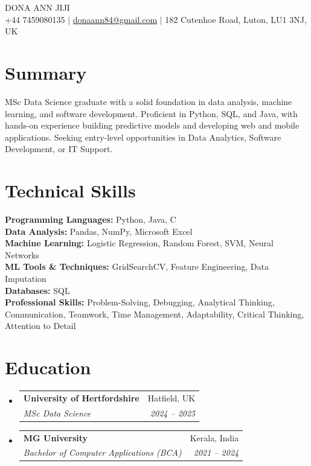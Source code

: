 \documentclass[a4paper,11pt]{article}
\makeatletter
\newcommand{\resumeSubheading}[4]{
  \item
    \begin{tabular*}{0.97\textwidth}[t]{l@{\extracolsep{\fill}}r}
      \textbf{#1} & #2 \\
      \textit{\small#3} & \textit{\small #4} \\
    \end{tabular*}\vspace{-5pt}
}
\newcommand{\resumeSubHeadingListStart}{\begin{itemize}[leftmargin=0.15in, label={}]}
\newcommand{\resumeSubHeadingListEnd}{\end{itemize}}
\makeatother
\begin{document}
\begin{center}
    {\Huge \scshape DONA ANN JIJI} \\ \vspace{4pt}
    \small
    +44 7459080135 $|$
    \href{mailto:donaann84@gmail.com}{donaann84@gmail.com} $|$
    182 Cutenhoe Road, Luton, LU1 3NJ, UK
\end{center}

\section{Summary}
MSc Data Science graduate with a solid foundation in data analysis, machine learning, and software development. Proficient in Python, SQL, and Java, with hands-on experience building predictive models and developing web and mobile applications. Seeking entry-level opportunities in Data Analytics, Software Development, or IT Support.

\section{Technical Skills}
\begin{itemize}[leftmargin=0.15in, label={}]
  \small{\item{
    \textbf{Programming Languages:} Python, Java, C \\
    \textbf{Data Analysis:} Pandas, NumPy, Microsoft Excel \\
    \textbf{Machine Learning:} Logistic Regression, Random Forest, SVM, Neural Networks \\
    \textbf{ML Tools \& Techniques:} GridSearchCV, Feature Engineering, Data Imputation \\
    \textbf{Databases:} SQL \\
    \textbf{Professional Skills:} Problem-Solving, Debugging, Analytical Thinking, Communication, Teamwork, Time Management, Adaptability, Critical Thinking, Attention to Detail
  }}
\end{itemize}

\section{Education}
\resumeSubHeadingListStart
  \resumeSubheading
    {University of Hertfordshire}{Hatfield, UK}
    {MSc Data Science}{2024 -- 2025}
  \resumeSubheading
    {MG University}{Kerala, India}
    {Bachelor of Computer Applications (BCA)}{2021 -- 2024}
\resumeSubHeadingListEnd
\end{document}
